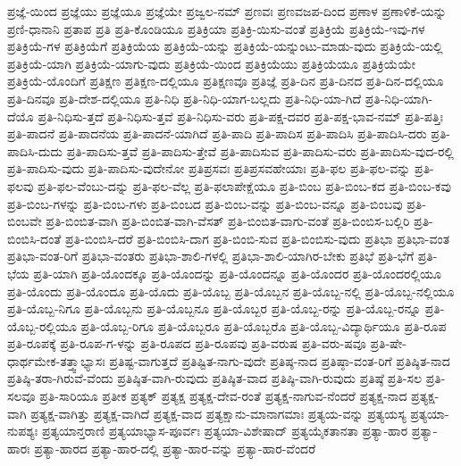 {ಪ್ರಜ್ಞೆ-ಯಿಂದ
ಪ್ರಜ್ಞೆಯು
ಪ್ರಜ್ಞೆಯೂ
ಪ್ರಜ್ಞೆಯೇ
ಪ್ರಜ್ವಲ-ನಮ್
ಪ್ರಣವಃ
ಪ್ರಣವಜಪ-ದಿಂದ
ಪ್ರಣಾಳ
ಪ್ರಣಾಳಿಕೆ-ಯನ್ನು
ಪ್ರಣಿ-ಧಾನಾನಿ
ಪ್ರತಾಪ
ಪ್ರತಿ
ಪ್ರತಿ-ಕೊಂಡಿಯೂ
ಪ್ರತಿಕ್ರಿಯಾ
ಪ್ರತಿಕ್ರಿ-ಯಿಸು-ವಂತೆ
ಪ್ರತಿಕ್ರಿಯೆ
ಪ್ರತಿಕ್ರಿಯೆ-ಇವು-ಗಳ
ಪ್ರತಿಕ್ರಿಯೆ-ಗಳ
ಪ್ರತಿಕ್ರಿಯೆಗೆ
ಪ್ರತಿಕ್ರಿಯೆಯ
ಪ್ರತಿಕ್ರಿಯೆ-ಯನ್ನು
ಪ್ರತಿಕ್ರಿಯೆ-ಯನ್ನುಂಟು-ಮಾಡು-ವುದು
ಪ್ರತಿಕ್ರಿಯೆ-ಯಲ್ಲಿ
ಪ್ರತಿಕ್ರಿಯೆ-ಯಾಗಿ
ಪ್ರತಿಕ್ರಿಯೆ-ಯಾಗು-ವುದು
ಪ್ರತಿಕ್ರಿಯೆ-ಯಿಂದ
ಪ್ರತಿಕ್ರಿಯೆಯು
ಪ್ರತಿಕ್ರಿಯೆಯೂ
ಪ್ರತಿಕ್ರಿಯೆಯೇ
ಪ್ರತಿಕ್ರಿಯೆ-ಯೊಂದಿಗೆ
ಪ್ರತಿಕ್ಷಣ
ಪ್ರತಿಕ್ಷಣ-ದಲ್ಲಿಯೂ
ಪ್ರತಿಕ್ಷಣವೂ
ಪ್ರತಿಜ್ಞೆ
ಪ್ರತಿ-ದಿನ
ಪ್ರತಿ-ದಿನದ
ಪ್ರತಿ-ದಿನ-ದಲ್ಲಿಯೂ
ಪ್ರತಿ-ದಿನವೂ
ಪ್ರತಿ-ದೇಶ-ದಲ್ಲಿಯೂ
ಪ್ರತಿ-ನಿಧಿ
ಪ್ರತಿ-ನಿಧಿ-ಯಾಗ-ಬಲ್ಲದು
ಪ್ರತಿ-ನಿಧಿ-ಯಾ-ಗಿದೆ
ಪ್ರತಿ-ನಿಧಿ-ಯಾಗಿ-ದೆಯೊ
ಪ್ರತಿ-ನಿಧಿಸು-ತ್ತದೆ
ಪ್ರತಿ-ನಿಧಿಸು-ತ್ತವೆ
ಪ್ರತಿ-ನಿಧಿಸು-ವರು
ಪ್ರತಿ-ಪಕ್ಷ-ದವರ
ಪ್ರತಿ-ಪಕ್ಷ-ಭಾವ-ನಮ್
ಪ್ರತಿ-ಪತ್ತಿಃ
ಪ್ರತಿ-ಪಾದನೆ
ಪ್ರತಿ-ಪಾದನೆಯ
ಪ್ರತಿ-ಪಾದನೆ-ಯಾಗಿದೆ
ಪ್ರತಿ-ಪಾದಿ
ಪ್ರತಿ-ಪಾದಿಸ
ಪ್ರತಿ-ಪಾದಿಸಿ
ಪ್ರತಿ-ಪಾದಿಸಿ-ದರು
ಪ್ರತಿ-ಪಾದಿಸಿ-ದುದು
ಪ್ರತಿ-ಪಾದಿಸು-ತ್ತವೆ
ಪ್ರತಿ-ಪಾದಿಸು-ತ್ತೇವೆ
ಪ್ರತಿ-ಪಾದಿಸುವ
ಪ್ರತಿ-ಪಾದಿಸು-ವರು
ಪ್ರತಿ-ಪಾದಿಸು-ವುದ-ರಲ್ಲಿ
ಪ್ರತಿ-ಪಾದಿಸು-ವುದು
ಪ್ರತಿ-ಪಾದಿಸು-ವುದೇನೋ
ಪ್ರತಿಪ್ರಸವಃ
ಪ್ರತಿಪ್ರಸವಹೇಯಾಃ
ಪ್ರತಿ-ಫಲ
ಪ್ರತಿ-ಫಲ-ವನ್ನು
ಪ್ರತಿ-ಫಲವು
ಪ್ರತಿ-ಫಲ-ವೆಂಬು-ದನ್ನು
ಪ್ರತಿ-ಫಲ-ವೆಲ್ಲ
ಪ್ರತಿ-ಫಲಾಪೇಕ್ಷೆಯೂ
ಪ್ರತಿ-ಬಿಂಬ
ಪ್ರತಿ-ಬಿಂಬ-ಕದ
ಪ್ರತಿ-ಬಿಂಬ-ಕವು
ಪ್ರತಿ-ಬಿಂಬ-ಗಳನ್ನು
ಪ್ರತಿ-ಬಿಂಬ-ಗಳು
ಪ್ರತಿ-ಬಿಂಬದ
ಪ್ರತಿ-ಬಿಂಬ-ವನ್ನು
ಪ್ರತಿ-ಬಿಂಬ-ವನ್ನೂ
ಪ್ರತಿ-ಬಿಂಬವು
ಪ್ರತಿ-ಬಿಂಬವೇ
ಪ್ರತಿ-ಬಿಂಬಿತ-ವಾಗಿ
ಪ್ರತಿ-ಬಿಂಬಿತ-ವಾಗಿ-ವೆಸತ್
ಪ್ರತಿ-ಬಿಂಬಿತ-ವಾಗು-ವಂತೆ
ಪ್ರತಿ-ಬಿಂಬಿಸ-ಬಲ್ಲಿರಿ
ಪ್ರತಿ-ಬಿಂಬಿಸಿ-ದಂತೆ
ಪ್ರತಿ-ಬಿಂಬಿಸಿ-ದರೆ
ಪ್ರತಿ-ಬಿಂಬಿಸಿ-ದಾಗ
ಪ್ರತಿ-ಬಿಂಬಿ-ಸುವ
ಪ್ರತಿ-ಬಿಂಬಿಸು-ವುದು
ಪ್ರತಿಭಾ
ಪ್ರತಿಭಾ-ವಂತ
ಪ್ರತಿಭಾ-ವಂತ-ರಿಗೆ
ಪ್ರತಿಭಾ-ವಂತರು
ಪ್ರತಿಭಾ-ಶಾಲಿ-ಗಳಲ್ಲಿ
ಪ್ರತಿಭಾ-ಶಾಲಿ-ಯಾಗಿರ-ಬೇಕು
ಪ್ರತಿಭೆ
ಪ್ರತಿ-ಭೆಗೆ
ಪ್ರತಿ-ಭೆಯ
ಪ್ರತಿ-ಯಾಗಿ
ಪ್ರತಿ-ಯೊಂದಕ್ಕೂ
ಪ್ರತಿ-ಯೊಂದನ್ನು
ಪ್ರತಿ-ಯೊಂದನ್ನೂ
ಪ್ರತಿ-ಯೊಂದರ
ಪ್ರತಿ-ಯೊಂದರಲ್ಲಿಯೂ
ಪ್ರತಿ-ಯೊಂದು
ಪ್ರತಿ-ಯೊಂದೂ
ಪ್ರತಿ-ಯೊದು
ಪ್ರತಿ-ಯೊಬ್ಬ
ಪ್ರತಿ-ಯೊಬ್ಬನ
ಪ್ರತಿ-ಯೊಬ್ಬ-ನಲ್ಲಿ
ಪ್ರತಿ-ಯೊಬ್ಬ-ನಲ್ಲಿಯೂ
ಪ್ರತಿ-ಯೊಬ್ಬ-ನಿಗೂ
ಪ್ರತಿ-ಯೊಬ್ಬನು
ಪ್ರತಿ-ಯೊಬ್ಬನೂ
ಪ್ರತಿ-ಯೊಬ್ಬರ
ಪ್ರತಿ-ಯೊಬ್ಬ-ರನ್ನು
ಪ್ರತಿ-ಯೊಬ್ಬ-ರನ್ನೂ
ಪ್ರತಿ-ಯೊಬ್ಬ-ರಲ್ಲಿಯೂ
ಪ್ರತಿ-ಯೊಬ್ಬ-ರಿಗೂ
ಪ್ರತಿ-ಯೊಬ್ಬರೂ
ಪ್ರತಿ-ಯೊಬ್ಬರೊ
ಪ್ರತಿ-ಯೊಬ್ಬ-ವಿದ್ಯಾರ್ಥಿಯೂ
ಪ್ರತಿ-ರೂಪ
ಪ್ರತಿ-ರೂಪಕ್ಕೆ
ಪ್ರತಿ-ರೂಪ-ಗ-ಳನ್ನು
ಪ್ರತಿ-ರೂಪದ
ಪ್ರತಿ-ರೂಪವು
ಪ್ರತಿ-ವರುಷ
ಪ್ರತಿ-ವರು-ಷವೂ
ಪ್ರತಿ-ಷೇ-ಧಾರ್ಥಮೇಕ-ತತ್ತ್ವಾಭ್ಯಾಸಃ
ಪ್ರತಿಷ್ಟ-ವಾಗುತ್ತದೆ
ಪ್ರತಿಷ್ಟಿತ-ನಾಗು-ವುದೇ
ಪ್ರತಿಷ್ಠ-ನಾದ
ಪ್ರತಿಷ್ಠಾ-ವಂತ-ರಿಗೆ
ಪ್ರತಿಷ್ಠಿತ-ನಾದ
ಪ್ರತಿಷ್ಠಿ-ತರಾ-ಗಿರುವೆ-ವೆಂದು
ಪ್ರತಿಷ್ಠಿತ-ವಾಗಿ-ರುವುದು
ಪ್ರತಿಷ್ಠಿತ-ವಾದ
ಪ್ರತಿಷ್ಠಿ-ವಾಗಿ-ರುವುದು
ಪ್ರತಿಷ್ಠೆ
ಪ್ರತಿ-ಸಲ
ಪ್ರತಿ-ಸಲವೂ
ಪ್ರತಿ-ಸಾರಿಯೂ
ಪ್ರತೀಕ
ಪ್ರತ್ಯಕ್
ಪ್ರತ್ಯಕ್ಷ
ಪ್ರತ್ಯಕ್ಷ-ದೇವ-ರಂತೆ
ಪ್ರತ್ಯಕ್ಷ-ನಾಗುವ-ನೆಂದರೆ
ಪ್ರತ್ಯಕ್ಷ-ನಾದ
ಪ್ರತ್ಯಕ್ಷ-ವಾಗಿ
ಪ್ರತ್ಯಕ್ಷ-ವಾಗಿತ್ತು
ಪ್ರತ್ಯಕ್ಷ-ವಾಗಿದೆ
ಪ್ರತ್ಯಕ್ಷ-ವಾದ
ಪ್ರತ್ಯಕ್ಷಾನು-ಮಾನಾಗಮಾಃ
ಪ್ರತ್ಯಯ-ವನ್ನು
ಪ್ರತ್ಯಯಸ್ಯ
ಪ್ರತ್ಯಯಾ-ನುಪಶ್ಯಃ
ಪ್ರತ್ಯಯಾನ್ತರಾಣಿ
ಪ್ರತ್ಯಯಾಭ್ಯಾಸ-ಪೂರ್ವಃ
ಪ್ರತ್ಯಯಾ-ವಿಶೇಷಾದ್
ಪ್ರತ್ಯಯೈಕತಾನತಾ
ಪ್ರತ್ಯಾ-ಹಾರ
ಪ್ರತ್ಯಾ-ಹಾರಃ
ಪ್ರತ್ಯಾ-ಹಾರದ
ಪ್ರತ್ಯಾ-ಹಾರ-ದಲ್ಲಿ
ಪ್ರತ್ಯಾ-ಹಾರ-ವನ್ನು
ಪ್ರತ್ಯಾ-ಹಾರ-ವೆಂದರೆ
}
